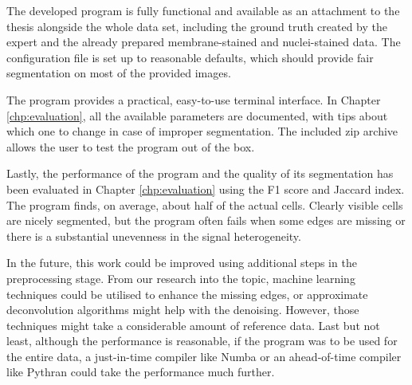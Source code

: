 \documentclass[
  digital,     %
  oneside,     %
  nosansbold,  %
  nocolorbold, %
  lof,         %
  lot,         %
]{fithesis4}
\begin{document}
The developed program is fully functional and available as an attachment to the thesis alongside the whole data set, including the ground truth
created by the expert and the already prepared membrane-stained and nuclei-stained data. The configuration file is set up to reasonable defaults, which should provide fair segmentation on most of the provided images.

The program provides a practical, easy-to-use terminal interface. In Chapter \ref{chp:evaluation}, all the available parameters are documented, with tips about which one to change in case of improper segmentation. The included zip archive allows the user to test the program out of the box.

Lastly, the performance of the program and the quality of its segmentation has been evaluated in Chapter \ref{chp:evaluation} using the F1 score and Jaccard index. The program finds, on average, about half of the actual cells. Clearly visible cells are nicely segmented, but the program often fails when some edges are missing or there is a substantial unevenness in the signal heterogeneity. 

In the future, this work could be improved using additional steps in the preprocessing stage. From our research into the topic, machine learning techniques could be utilised to enhance the missing edges, or approximate deconvolution algorithms might help with the denoising. However, those techniques might take a considerable amount of reference data. Last but not least, although the performance is reasonable, if the program was to be used for the entire data, a just-in-time compiler like Numba or an ahead-of-time compiler like Pythran could take the performance much further.
\end{document}
